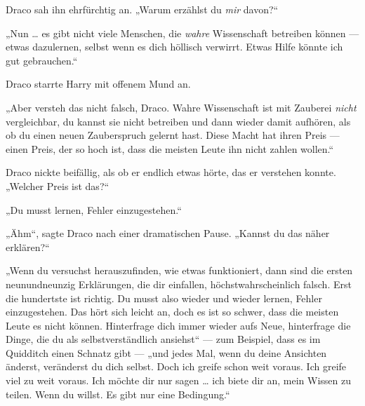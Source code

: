 Draco sah ihn ehrfürchtig an.
„Warum erzählst du \emph{mir} davon?“

„Nun … es gibt nicht viele Menschen, die \emph{wahre} Wissenschaft betreiben können — etwas dazulernen, selbst wenn es dich höllisch verwirrt. Etwas Hilfe könnte ich gut gebrauchen.“

Draco starrte Harry mit offenem Mund an.

„Aber versteh das nicht falsch, Draco. Wahre Wissenschaft ist mit Zauberei \emph{nicht} vergleichbar, du kannst sie nicht betreiben und dann wieder damit aufhören, als ob du einen neuen Zauberspruch gelernt hast. Diese Macht hat ihren Preis — einen Preis, der so hoch ist, dass die meisten Leute ihn nicht zahlen wollen.“

Draco nickte beifällig, als ob er endlich etwas hörte, das er verstehen konnte.
„Welcher Preis ist das?“

„Du musst lernen, Fehler einzugestehen.“

„Ähm“, sagte Draco nach einer dramatischen Pause.
„Kannst du das näher erklären?“

„Wenn du versuchst herauszufinden, wie etwas funktioniert, dann sind die ersten neunundneunzig Erklärungen, die dir einfallen, höchstwahrscheinlich falsch. Erst die hundertste ist richtig. Du musst also wieder und wieder lernen, Fehler einzugestehen. Das hört sich leicht an, doch es ist so schwer, dass die meisten Leute es nicht können. Hinterfrage dich immer wieder aufs Neue, hinterfrage die Dinge, die du als selbstverständlich ansiehst“ — zum Beispiel, dass es im Quidditch einen Schnatz gibt — „und jedes Mal, wenn du deine Ansichten änderst, veränderst du dich selbst. Doch ich greife schon weit voraus. Ich greife viel zu weit voraus. Ich möchte dir nur sagen … ich biete dir an, mein Wissen zu teilen. Wenn du willst. Es gibt nur eine Bedingung.“

